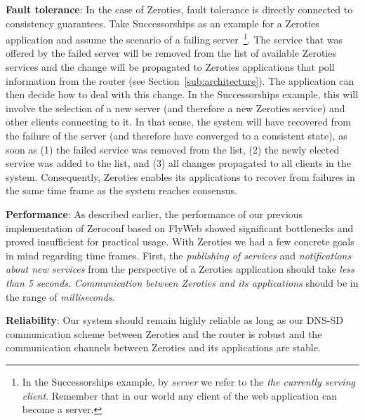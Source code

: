 \textbf{Fault tolerance}:
In the case of Zeroties, fault tolerance is directly connected to consistency guarantees.
Take Successorships as an example for a Zeroties application and assume the scenario of a failing server~\footnote{In the Successorships example, by \textit{server} we refer to the \textit{the currently serving client}. Remember that in our world any client of the web application can become a server.}.
The service that was offered by the failed server will be removed from the list of available Zeroties services and the change will be propagated to Zeroties applications that poll information from the router (see Section~\ref{sub:architecture}).
The application can then decide how to deal with this change.
In the Successorships example, this will involve the selection of a new server (and therefore a new Zeroties service) and other clients connecting to it.
In that sense, the system will have recovered from the failure of the server (and therefore have converged to a consistent state), as soon as (1) the failed service was removed from the list, (2) the newly elected service was added to the list, and (3) all changes propagated to all clients in the system.
Consequently, Zeroties enables its applications to recover from failures in the same time frame as the system reaches consensus.

\textbf{Performance}:
As described earlier, the performance of our previous implementation of Zeroconf based on FlyWeb showed significant bottlenecks and proved insufficient for practical usage.
With Zeroties we had a few concrete goals in mind regarding time frames. 
First, the \textit{publishing of services} and \textit{notifications about new services} from the perspective of a Zeroties application should take \textit{less than 5 seconds}.
\textit{Communication between Zeroties and its applications} should be in the range of \textit{milliseconds}.

\textbf{Reliability}:
Our system should remain highly reliable as long as our DNS-SD communication scheme between Zeroties and the router is robust and the communication channels between Zeroties and its applications are stable.

